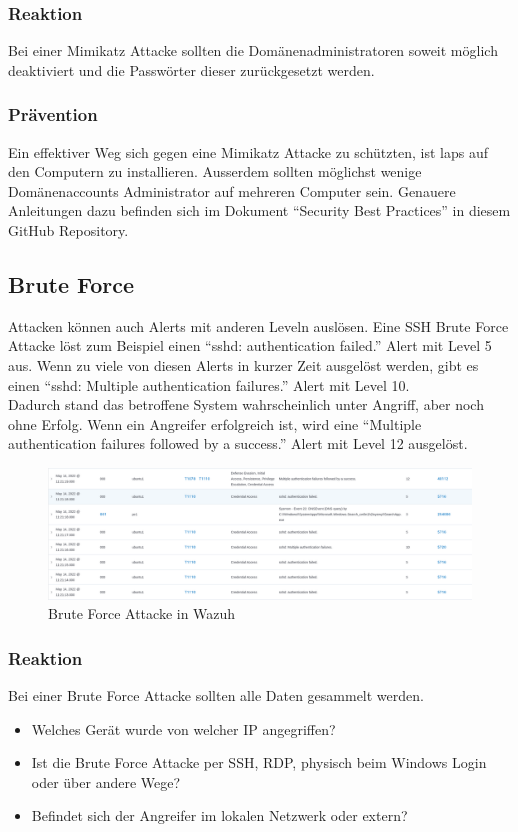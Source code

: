 \subsubsection{Reaktion}
Bei einer Mimikatz Attacke sollten die Domänenadministratoren soweit möglich deaktiviert und die Passwörter dieser zurückgesetzt werden.

\subsubsection{Prävention}
Ein effektiver Weg sich gegen eine Mimikatz Attacke zu schützten, ist \acrshort{laps} auf den Computern zu installieren. 
Ausserdem sollten möglichst wenige Domänenaccounts Administrator auf mehreren Computer sein.
Genauere Anleitungen dazu befinden sich im Dokument ``Security Best Practices'' in diesem GitHub Repository.

\subsection{Brute Force}
Attacken können auch Alerts mit anderen Leveln auslösen. 
Eine SSH Brute Force Attacke löst zum Beispiel einen ``sshd: authentication failed.'' Alert mit Level 5 aus.
Wenn zu viele von diesen Alerts in kurzer Zeit ausgelöst werden, gibt es einen ``sshd: Multiple authentication failures.'' Alert mit Level 10.\\

Dadurch stand das betroffene System wahrscheinlich unter Angriff, aber noch ohne Erfolg.
Wenn ein Angreifer erfolgreich ist, wird eine ``Multiple authentication failures followed by a success.'' Alert mit Level 12 ausgelöst.
\begin{figure}[H]
    \centering
    \includegraphics[width=\linewidth]{../img/brute-force.png}
    \caption{Brute Force Attacke in Wazuh}
\end{figure}

\subsubsection{Reaktion}
Bei einer Brute Force Attacke sollten alle Daten gesammelt werden.
\begin{itemize}
    \item Welches Gerät wurde von welcher IP angegriffen?
    \item Ist die Brute Force Attacke per SSH, RDP, physisch beim Windows Login oder über andere Wege? 
    \item Befindet sich der Angreifer im lokalen Netzwerk oder extern?
\end{itemize}

